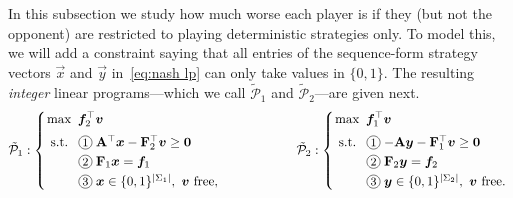 \documentclass{homework}
\begin{document}
In this subsection we study how much worse each player is if they (but not the opponent) are restricted to playing deterministic strategies only. To model this, we will add a constraint saying that all entries of the sequence-form strategy vectors $\vec{x}$ and $\vec{y}$ in~\eqref{eq:nash lp} can only take values in $\{0, 1\}$. The resulting \emph{integer} linear programs---which we call $\tilde{\mathcal{P}}_1$ and $\tilde{\mathcal{P}}_2$---are given next.
\begin{equation}\label{eq:deterministic ilp}
    \arraycolsep=1.0pt
    \tilde{\mathcal{P}}_1 : \mleft\lbrace\begin{array}{l}
        \displaystyle\max~ \vec{f}_2^\top \vec{v}\\[2mm]
        \hspace{1mm}\text{\normalfont s.t.}~~ 
        \arraycolsep=1.4pt
        \begin{array}[t]{ll}
            \circled{1}   & \mat{A}^\top \vec{x} - \mat{F}_2^\top \vec{v} \ge \vec{0} \\[1mm]
            \circled{2}   & \mat{F}_1\vec{x}                      = \vec{f}_1 \\[1mm]
            \circled{3}   & \vec{x} \in \{0,1\}^{|\Sigma_1|},~\vec{v}~\text{free},
        \end{array} %
    \end{array}\mright.
    \hspace{2cm}
    \tilde{\mathcal{P}}_2 : \mleft\lbrace\begin{array}{l}
        \displaystyle\max~ \vec{f}_1^\top \vec{v}\\[2mm]
        \hspace{1mm}\text{\normalfont s.t.}~~ 
        \arraycolsep=1.4pt
        \begin{array}[t]{ll}
            \circled{1}   & -\mat{A} \vec{y} - \mat{F}_1^\top \vec{v} \ge \vec{0} \\[1mm]
            \circled{2}   & \mat{F}_2\vec{y}                      = \vec{f}_2 \\[1mm]
            \circled{3}   & \vec{y} \in \{0,1\}^{|\Sigma_2|},~\vec{v}~\text{free}.
        \end{array} %
    \end{array}\mright.
\end{equation}
\end{document}
